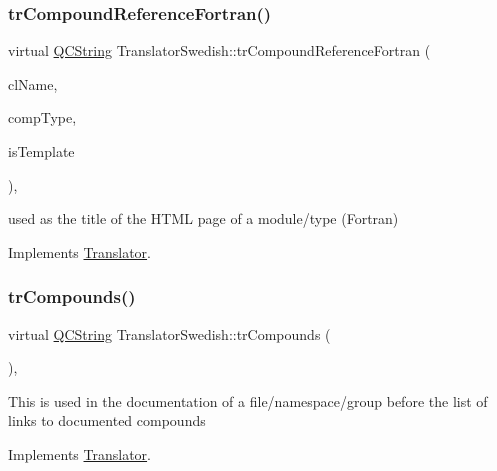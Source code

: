\subsubsection{\texorpdfstring{trCompoundReferenceFortran()}{trCompoundReferenceFortran()}}
{\footnotesize\ttfamily virtual \mbox{\hyperlink{class_q_c_string}{Q\+C\+String}} Translator\+Swedish\+::tr\+Compound\+Reference\+Fortran (\begin{DoxyParamCaption}\item[{const char $\ast$}]{cl\+Name,  }\item[{\mbox{\hyperlink{class_class_def_ae70cf86d35fe954a94c566fbcfc87939}{Class\+Def\+::\+Compound\+Type}}}]{comp\+Type,  }\item[{bool}]{is\+Template }\end{DoxyParamCaption})\hspace{0.3cm}{\ttfamily [inline]}, {\ttfamily [virtual]}}

used as the title of the H\+T\+ML page of a module/type (Fortran) 

Implements \mbox{\hyperlink{class_translator}{Translator}}.

\mbox{\label{class_translator_swedish_a500a641eb775f0671a651e7abd28c19e}} 
\subsubsection{\texorpdfstring{trCompounds()}{trCompounds()}}
{\footnotesize\ttfamily virtual \mbox{\hyperlink{class_q_c_string}{Q\+C\+String}} Translator\+Swedish\+::tr\+Compounds (\begin{DoxyParamCaption}{ }\end{DoxyParamCaption})\hspace{0.3cm}{\ttfamily [inline]}, {\ttfamily [virtual]}}

This is used in the documentation of a file/namespace/group before the list of links to documented compounds 

Implements \mbox{\hyperlink{class_translator}{Translator}}.

\mbox{\label{class_translator_swedish_a6241fbbfbba9ba72810df238bc41cbe9}} 
